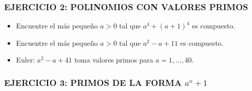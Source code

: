 \begin{frame}
  \frametitle{EJERCICIO 2: POLINOMIOS CON VALORES PRIMOS}

  \begin{itemize}
  \item<2-> Encuentre el más pequeño $a > 0$ tal que $a^4 + (a+1)^4$ es
    compuesto.

  \item<3-> Encuentre el más pequeño $a > 0$ tal que $a^2 - a + 11$ es
    compuesto.

  \item<4-> Euler: $a^2 - a + 41$ toma valores primos para $a = 1, \ldots, 40$.
  \end{itemize}
\end{frame}

\begin{frame}
  \frametitle{EJERCICIO 3: PRIMOS DE LA FORMA $a^n + 1$}



\end{frame}

